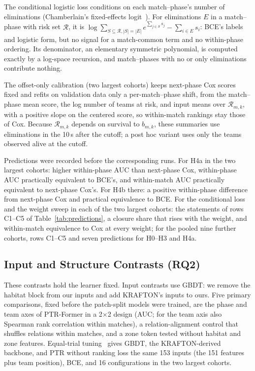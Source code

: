 \documentclass[sigconf,anonymous]{acmart}
\begin{document}
The conditional logistic loss conditions on each match--phase's number of eliminations (Chamberlain's fixed-effects logit~\cite{Chamberlain80}). For eliminations $E$ in a match--phase with risk set $\mathcal{R}$, it is $\log\sum_{S\subseteq\mathcal{R},|S|=|E|}e^{\sum_{j\in S}s_j}-\sum_{i\in E}s_i$: BCE's labels and logistic form, but no signal for a match-common term and no within-phase ordering. Its denominator, an elementary symmetric polynomial, is computed exactly by a log-space recursion, and match--phases with no or only eliminations contribute nothing.

The offset-only calibration (two largest cohorts) keeps next-phase Cox scores fixed and refits on validation data only a per-match--phase shift, from the match--phase mean score, the log number of teams at risk, and input means over $\mathcal{R}_{m,k}$, with a positive slope on the centered score, so within-match rankings stay those of Cox. Because $\mathcal{R}_{m,k}$ depends on survival to $b_{m,k}$, these summaries use eliminations in the 10\,s after the cutoff; a post hoc variant uses only the teams observed alive at the cutoff.

Predictions were recorded before the corresponding runs. For H4a in the two largest cohorts: higher within-phase AUC than next-phase Cox, within-phase AUC practically equivalent to BCE's, and within-match AUC practically equivalent to next-phase Cox's. For H4b there: a positive within-phase difference from next-phase Cox and practical equivalence to BCE. For the conditional loss and the weight sweep in each of the two largest cohorts: the statements of rows C1--C5 of Table~\ref{tab:predictions}, a closure share that rises with the weight, and within-match equivalence to Cox at every weight; for the pooled nine further cohorts, rows C1--C5 and seven predictions for H0--H3 and H4a.

\subsection{Input and Structure Contrasts (RQ2)}
\label{sec:method:contrasts}
These contrasts hold the learner fixed. Input contrasts use GBDT: we remove the habitat block from our inputs and add KRAFTON's inputs to ours. Five primary comparisons, fixed before the patch-split models were trained, are the phase and team axes of PTR-Former in a 2$\times$2 design (AUC; for the team axis also Spearman rank correlation within matches), a relation-alignment control that shuffles relations within matches, and a zone token tested without habitat and zone features. Equal-trial tuning~\cite{Bergstra12,Cawley10} gives GBDT, the KRAFTON-derived backbone, and PTR without ranking loss the same 153 inputs (the 151 features plus team position), BCE, and 16 configurations in the two largest cohorts.
\end{document}
